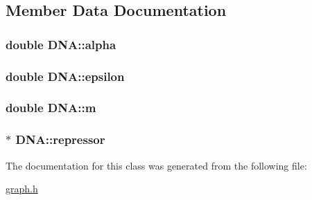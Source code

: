 \subsection{Member Data Documentation}
\hypertarget{class_d_n_a_a30c4d522f315530f9ce72e84afd6804c}{
\subsubsection[{alpha}]{\setlength{\rightskip}{0pt plus 5cm}double D\-N\-A\-::alpha\hspace{0.3cm}{\ttfamily [private]}}}\label{class_d_n_a_a30c4d522f315530f9ce72e84afd6804c}
\hypertarget{class_d_n_a_a0dbd4309884cc23e9cbaf6cf4dc5ba0e}{
\subsubsection[{epsilon}]{\setlength{\rightskip}{0pt plus 5cm}double D\-N\-A\-::epsilon\hspace{0.3cm}{\ttfamily [private]}}}\label{class_d_n_a_a0dbd4309884cc23e9cbaf6cf4dc5ba0e}
\hypertarget{class_d_n_a_ad9f4838495b5f66e494a8adb3384b919}{
\subsubsection[{m}]{\setlength{\rightskip}{0pt plus 5cm}double D\-N\-A\-::m\hspace{0.3cm}{\ttfamily [private]}}}\label{class_d_n_a_ad9f4838495b5f66e494a8adb3384b919}
\hypertarget{class_d_n_a_a08dd607e26ea53375e0c6d61c0c04ba9}{
\subsubsection[{repressor}]{$\ast$ D\-N\-A\-::repressor\hspace{0.3cm}{\ttfamily [private]}}}\label{class_d_n_a_a08dd607e26ea53375e0c6d61c0c04ba9}


The documentation for this class was generated from the following file\-:\begin{DoxyCompactItemize}
\item 
\hyperlink{graph_8h}{graph.\-h}\end{DoxyCompactItemize}
